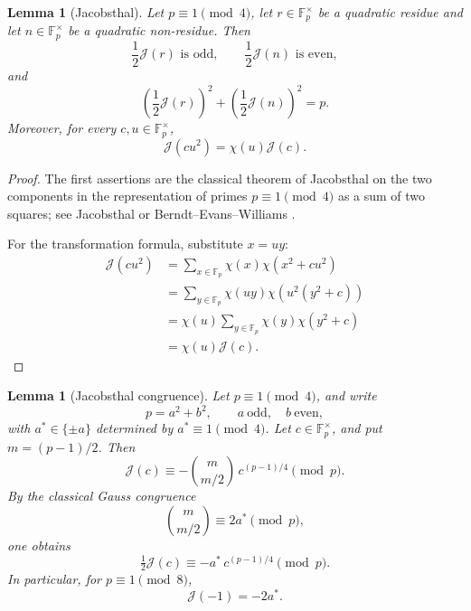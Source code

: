 \documentclass[11pt]{amsart}
\theoremstyle{plain}
\newtheorem{lemma}[theorem]{Lemma}
\theoremstyle{definition}
\newcommand{\Jac}{\mathcal{J}}
\begin{document}
\begin{lemma}[Jacobsthal]\label{lem:jacobsthal}
Let $p\equiv1\pmod4$, let $r\in\mathbb F_p^\times$ be a quadratic residue and
let $n\in\mathbb F_p^\times$ be a quadratic non-residue. Then
\[
  \frac12\Jac(r) \text{ is odd},\qquad
  \frac12\Jac(n) \text{ is even},
\]
and
\[
  \left(\frac12\Jac(r)\right)^2+
  \left(\frac12\Jac(n)\right)^2=p.
\]
Moreover, for every $c,u\in\mathbb F_p^\times$,
\[
  \Jac(cu^2)=\chi(u)\Jac(c).
\]
\end{lemma}

\begin{proof}
The first assertions are the classical theorem of Jacobsthal on the two
components in the representation of primes $p\equiv1\pmod4$ as a sum of two
squares; see Jacobsthal \cite{Jacobsthal} or
Berndt--Evans--Williams \cite[Chapter~6]{BEW}.

For the transformation formula, substitute $x=uy$:
\[
\begin{aligned}
 \Jac(cu^2)
 &=\sum_{x\in\mathbb F_p}\chi(x)\chi(x^2+cu^2)\\
 &=\sum_{y\in\mathbb F_p}\chi(uy)\chi(u^2(y^2+c))\\
 &=\chi(u)\sum_{y\in\mathbb F_p}\chi(y)\chi(y^2+c)\\
 &=\chi(u)\Jac(c).
\end{aligned}
\]
\end{proof}

\begin{lemma}[Jacobsthal congruence]\label{lem:jac-cong}
Let $p\equiv1\pmod4$, and write
\[
  p=a^2+b^2,\qquad a\ \text{odd},\quad b\ \text{even},
\]
with $a^{*}\in\{\pm a\}$ determined by $a^{*}\equiv1\pmod4$.
Let $c\in\mathbb F_p^\times$, and put $m=(p-1)/2$. Then
\[
  \Jac(c)\equiv -\binom{m}{m/2}\,c^{(p-1)/4}\pmod p.
\]
By the classical Gauss congruence
\[
  \binom{m}{m/2}\equiv 2a^{*}\pmod p,
\]
one obtains
\[
  \tfrac12\Jac(c)\equiv -a^{*}\,c^{(p-1)/4}\pmod p.
\]
In particular, for $p\equiv1\pmod8$,
\[
  \Jac(-1)=-2a^{*}.
\]
\end{lemma}
\end{document}
